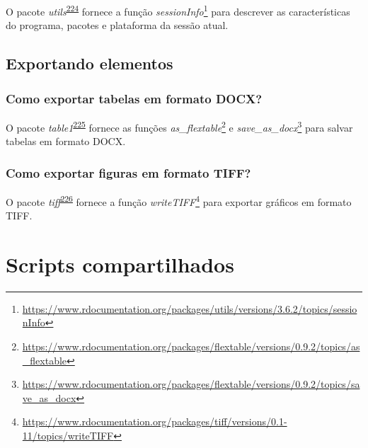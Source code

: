 \documentclass[
  a4paper,
]{book}
\renewcommand{\href}[2]{#2\footnote{\url{#1}}}
\newenvironment{infobox}[1]
  {
  \begin{itemize}
  \renewcommand{\labelitemi}{
    \raisebox{-.7\height}[0pt][0pt]{
      {\setkeys{Gin}{width=3em,keepaspectratio}
        \texttt{[image: \#1]}}
    }
  }
  \setlength{\fboxsep}{1em}
  \begin{blackbox}
  \item
  }
  {
  \end{blackbox}
  \end{itemize}
  }
\begin{document}
\begin{infobox}{images/Rlogo}
O pacote \emph{utils}\textsuperscript{\protect\hyperlink{ref-utils}{224}} fornece a função \href{https://www.rdocumentation.org/packages/utils/versions/3.6.2/topics/sessionInfo}{\emph{sessionInfo}} para descrever as características do programa, pacotes e plataforma da sessão atual.

\end{infobox}

\hypertarget{exportar}{%
\section{Exportando elementos}\label{exportar}}

\hypertarget{como-exportar-tabelas-em-formato-docx}{%
\subsection{Como exportar tabelas em formato DOCX?}\label{como-exportar-tabelas-em-formato-docx}}

\begin{infobox}{images/Rlogo}
O pacote \emph{table1}\textsuperscript{\protect\hyperlink{ref-flextable}{225}} fornece as funções \href{https://www.rdocumentation.org/packages/flextable/versions/0.9.2/topics/as_flextable}{\emph{as\_flextable}} e \href{https://www.rdocumentation.org/packages/flextable/versions/0.9.2/topics/save_as_docx}{\emph{save\_as\_docx}} para salvar tabelas em formato DOCX.

\end{infobox}

\hypertarget{como-exportar-figuras-em-formato-tiff}{%
\subsection{Como exportar figuras em formato TIFF?}\label{como-exportar-figuras-em-formato-tiff}}

\begin{infobox}{images/Rlogo}
O pacote \emph{tiff}\textsuperscript{\protect\hyperlink{ref-tiff}{226}} fornece a função \href{https://www.rdocumentation.org/packages/tiff/versions/0.1-11/topics/writeTIFF}{\emph{writeTIFF}} para exportar gráficos em formato TIFF.

\end{infobox}

\hypertarget{scripts-compartilhados}{%
\chapter{\texorpdfstring{\textbf{Scripts compartilhados}}{Scripts compartilhados}}\label{scripts-compartilhados}}
\end{document}
